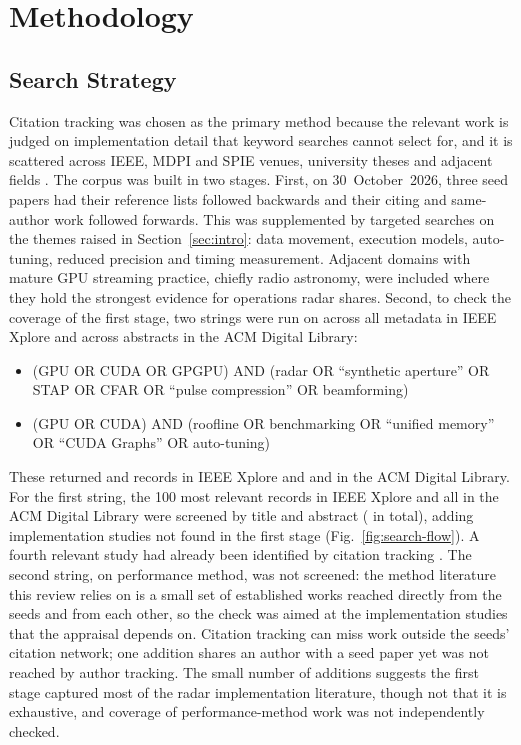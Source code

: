 \section{Methodology}
\label{sec:method}

\subsection{Search Strategy}
Citation tracking was chosen as the primary method because the relevant work
is judged on implementation detail that keyword searches cannot select for,
and it is scattered across IEEE, MDPI and SPIE venues, university theses and
adjacent fields \cite{wohlinGuidelinesSnowballingSystematic2014}.
The corpus was built in two stages.
First, on 30~October~2026, three seed papers
\cite{zhaoGPUAcceleratedSignalProcessing2023,
  bensonGPUbasedSpacetimeAdaptive2013a, perdanaSurveyGraphicsProcessing2017}
had their reference lists followed backwards and their citing and same-author
work followed forwards.
This was supplemented by targeted searches on the themes raised in
Section~\ref{sec:intro}: data movement, execution models, auto-tuning, reduced
precision and timing measurement.
Adjacent domains with mature GPU streaming practice, chiefly radio astronomy,
were included where they hold the strongest evidence for operations radar
shares.
Second, to check the coverage of the first stage, two strings were run on
\searchdate{} across all metadata in IEEE Xplore and across abstracts in the
ACM Digital Library:
\begin{itemize}
  \item (GPU OR CUDA OR GPGPU) AND (radar OR ``synthetic aperture'' OR STAP
        OR CFAR OR ``pulse compression'' OR beamforming)
  \item (GPU OR CUDA) AND (roofline OR benchmarking OR ``unified memory''
        OR ``CUDA Graphs'' OR auto-tuning)
\end{itemize}
These returned \nXploreA{} and \nXploreB{} records in IEEE Xplore and
\nACMA{} and \nACMB{} in the ACM Digital Library.
For the first string, the 100 most relevant records in IEEE Xplore and all
\nACMA{} in the ACM Digital Library were screened by title and abstract
(\nScreened{} in total), adding \nAdded{} implementation studies not found in
the first stage \cite{perdanaRadarSignalProcessing2019,
  pavlovImplementationSyntheticAperture2019,
  fangRealtimeImplementationPhased2024} (Fig.~\ref{fig:search-flow}).
A fourth relevant study had already been identified by citation tracking
\cite{yangGPUOrientedDesignsConstant2022a}.
The second string, on performance method, was not screened: the method
literature this review relies on is a small set of established works reached
directly from the seeds and from each other, so the check was aimed at the
implementation studies that the appraisal depends on.
Citation tracking can miss work outside the seeds' citation network; one
addition shares an author with a seed paper yet was not reached by author
tracking.
The small number of additions suggests the first stage captured most of the
radar implementation literature, though not that it is exhaustive, and
coverage of performance-method work was not independently checked.

